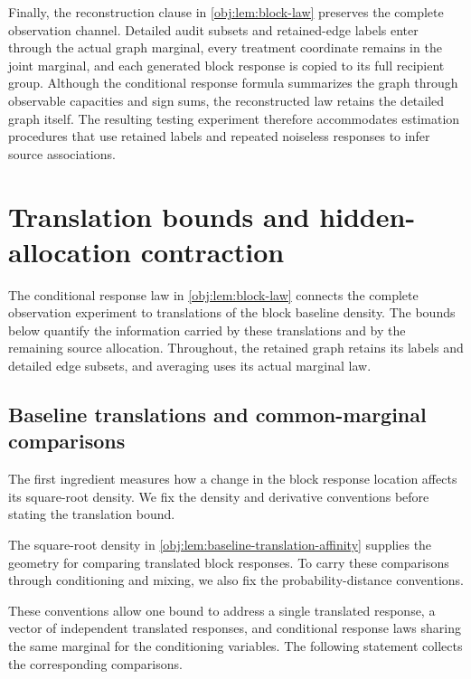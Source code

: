 \documentclass[11pt]{article}
\begin{document}
Finally, the reconstruction clause in \cref{obj:lem:block-law} preserves the complete observation channel. Detailed audit subsets and retained-edge labels enter through the actual graph marginal, every treatment coordinate remains in the joint marginal, and each generated block response is copied to its full recipient group. Although the conditional response formula summarizes the graph through observable capacities and sign sums, the reconstructed law retains the detailed graph itself. The resulting testing experiment therefore accommodates estimation procedures that use retained labels and repeated noiseless responses to infer source associations.


\section{Translation bounds and hidden-allocation contraction}

The conditional response law in \cref{obj:lem:block-law} connects the complete observation experiment to translations of the block baseline density. The bounds below quantify the information carried by these translations and by the remaining source allocation. Throughout, the retained graph retains its labels and detailed edge subsets, and averaging uses its actual marginal law.

\subsection{Baseline translations and common-marginal comparisons}

The first ingredient measures how a change in the block response location affects its square-root density. We fix the density and derivative conventions before stating the translation bound.



The square-root density in \cref{obj:lem:baseline-translation-affinity} supplies the geometry for comparing translated block responses. To carry these comparisons through conditioning and mixing, we also fix the probability-distance conventions.



These conventions allow one bound to address a single translated response, a vector of independent translated responses, and conditional response laws sharing the same marginal for the conditioning variables. The following statement collects the corresponding comparisons.
\end{document}
